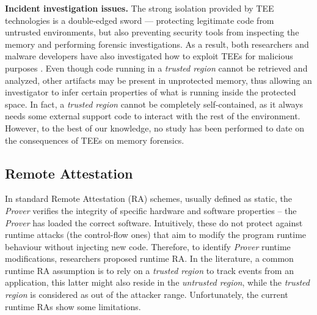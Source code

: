 \vspace{0.5cm}
\noindent \textbf{Incident investigation issues.}
The strong isolation provided by TEE technologies is a double-edged
sword --- protecting legitimate code from untrusted environments,
but also preventing security tools from inspecting the memory and performing
forensic investigations. 
As a result, both researchers and malware developers have also investigated how 
to exploit TEEs for malicious purposes 
\citep{thoughs-on-intel1,thoughs-on-intel2,sgxrop,snakegx,sgxsidechannel}.
Even though code running in a \emph{trusted region} cannot be retrieved and 
analyzed, other artifacts may be present in unprotected memory, thus allowing 
an investigator to infer certain properties of what is running inside the 
protected space.
In fact, a \emph{trusted region} cannot be completely self-contained, as it 
always needs some external support code to interact with the rest of the 
environment.
However, to the best of our knowledge, no study has been performed to date on 
the consequences of TEEs on memory forensics.

\subsection{Remote Attestation}

In standard Remote Attestation (RA) schemes, usually defined as static, the 
\emph{Prover} verifies the integrity of specific hardware and 
software properties -- the \emph{Prover} has loaded the correct software.
Intuitively, these do not protect against runtime attacks (\eg the 
control-flow ones) that aim to modify the program runtime behaviour without 
injecting new code. 
Therefore, to identify \emph{Prover} runtime modifications, researchers 
proposed runtime RA.
In the literature, a common runtime RA assumption is to rely on a \emph{trusted 
region} to track events from an application, this latter might also reside in 
the \emph{untrusted region}, while the \emph{trusted region} is considered as 
out of the attacker range.
Unfortunately, the current runtime RAs show some limitations.


